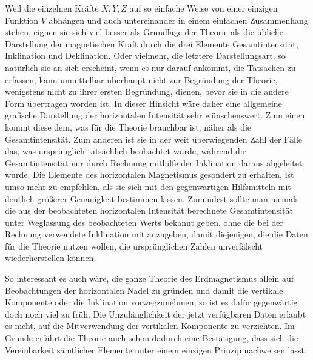 Weil die einzelnen Kräfte $X,Y,Z$ auf so einfache Weise von einer einzigen Funktion $V$ abhängen und auch untereinander in einem einfachen Zusammenhang stehen, eignen sie sich viel besser als Grundlage der Theorie als die übliche Darstellung der magnetischen Kraft durch die drei Elemente Gesamtintensität, Inklination und Deklination. Oder vielmehr, die letztere Darstellungsart. so natürlich sie an sich erscheint, wenn es nur darauf ankommt, die Tatsachen zu erfassen, kann unmittelbar überhaupt nicht zur Begründung der Theorie, wenigstens nicht zu ihrer ersten Begründung, dienen, bevor sie in die andere Form übertragen worden ist. In dieser Hinsicht wäre daher eine allgemeine grafische Darstellung der horizontalen Intensität sehr wünschenswert. Zum einen kommt diese dem, was für die Theorie brauchbar ist, näher als die Gesamtintensität. Zum anderen ist sie in der weit überwiegenden Zahl der Fälle das, was ursprünglich tatsächlich beobachtet wurde, während die Gesamtintensität nur durch Rechnung mithilfe der Inklination daraus abgeleitet wurde. Die Elemente des horizontalen Magnetismus gesondert zu erhalten, ist umso mehr zu empfehlen, als sie sich mit den gegenwärtigen Hilfsmitteln mit deutlich größerer Genauigkeit bestimmen lassen. Zumindest sollte man niemals die aus der beobachteten horizontalen Intensität berechnete Gesamtintensität unter Weglassung des beobachteten Werts bekannt geben, ohne die bei der Rechnung verwendete Inklination mit anzugeben, damit diejenigen, die die Daten für die Theorie nutzen wollen, die ursprünglichen Zahlen unverfälscht wiederherstellen können.

So interessant es auch wäre, die ganze Theorie des Erdmagnetismus allein auf Beobachtungen der horizontalen Nadel zu gründen und damit die vertikale Komponente oder die Inklination vorwegzunehmen, so ist es dafür gegenwärtig doch noch viel zu früh. Die Unzulänglichkeit der jetzt verfügbaren Daten erlaubt es nicht, auf die Mitverwendung der vertikalen Komponente zu verzichten. Im Grunde erfährt die Theorie auch schon dadurch eine Bestätigung, dass sich die Vereinbarkeit sämtlicher Elemente unter einem einzigen Prinzip nachweisen lässt.



